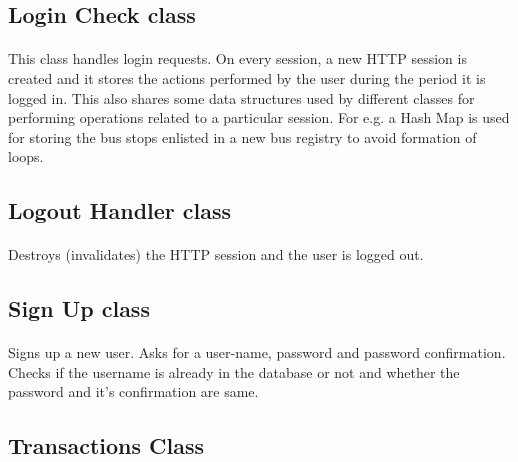 \documentclass[11pt]{article}
\begin{document}
\subsection{Login Check class}
\paragraph{}
This class handles login requests. On every session, a new HTTP session is created and it stores the actions performed by the user during the period it is logged in. This also shares some data structures used by different classes for performing operations related to a particular session. For e.g. a Hash Map is used for storing the bus stops enlisted in a new bus registry to avoid formation of loops.

\subsection{Logout Handler class}
\paragraph{}
Destroys (invalidates) the HTTP session and the user is logged out.

\subsection{Sign Up class}
\paragraph{}
Signs up a new user. Asks for a user-name, password and password confirmation. Checks if the username is already in the database or not and whether the password and it's confirmation are same.

\subsection{Transactions Class}
\paragraph{}
\end{document}
